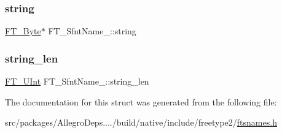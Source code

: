 \mbox{\label{struct_f_t___sfnt_name___ab369e2c3d8dc9662f69c53e4d3158067}} 
\subsubsection{\texorpdfstring{string}{string}}
{\footnotesize\ttfamily \hyperlink{fttypes_8h_a51f26183ca0c9f4af958939648caeccd}{F\+T\+\_\+\+Byte}$\ast$ F\+T\+\_\+\+Sfnt\+Name\+\_\+\+::string}

\mbox{\label{struct_f_t___sfnt_name___a4ebdb7207b5681d16f9cc17f432cb56f}} 
\subsubsection{\texorpdfstring{string\+\_\+len}{string\_len}}
{\footnotesize\ttfamily \hyperlink{fttypes_8h_abcb8db4dbf35d2b55a9e8c7b0926dc52}{F\+T\+\_\+\+U\+Int} F\+T\+\_\+\+Sfnt\+Name\+\_\+\+::string\+\_\+len}



The documentation for this struct was generated from the following file\+:\begin{DoxyCompactItemize}
\item 
src/packages/\+Allegro\+Deps..../build/native/include/freetype2/\hyperlink{ftsnames_8h}{ftsnames.\+h}\end{DoxyCompactItemize}

